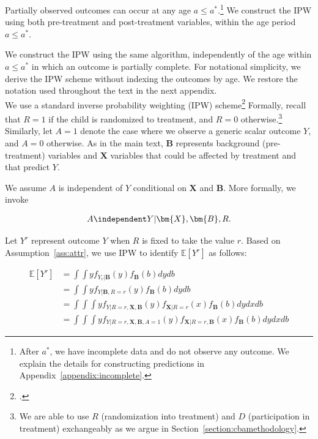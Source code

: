 \noindent Partially observed outcomes can occur at any age $a \leq a^*$.\footnote{After $a^*$, we have incomplete data and do not observe any outcome. We explain the details for constructing predictions in Appendix~\ref{appendix:incomplete}.} We construct the IPW using both pre-treatment and post-treatment variables, within the age period  $a \leq a^*$.

\noindent We construct the IPW using the same algorithm, independently of the age within $a \leq a^*$ in which an outcome is partially complete. For notational simplicity, we derive the IPW scheme without indexing the outcomes by age. We restore the notation used throughout the text in the next appendix. \\

\noindent We use a standard inverse probability weighting (IPW) scheme\footnote{\citet{Horvitz_Thompson_1952_JASA}.} Formally, recall that $R = 1$ if the child is randomized to treatment, and $R = 0$ otherwise.\footnote{We are able to use $R$ (randomization into treatment) and $D$ (participation in treatment) exchangeably as we argue in Section~\ref{section:cbamethodology}.} Similarly, let $A = 1$ denote the case where we observe a generic scalar outcome $Y$, and $A = 0$ otherwise. As in the main text, $\bm{B}$ represents background (pre-treatment) variables and $\bm{X}$ variables that could be affected by treatment and that predict $Y$.

\noindent We assume $A$ is independent of $Y$ conditional on $\bm{X}$ and $\bm{B}$. More formally, we invoke

\begin{assumption} \label{ass:attr}
	\begin{align*}
		A \independent Y | \bm{X}, \bm{B}, R.
	\end{align*}
\end{assumption}

\noindent Let $Y^{r}$ represent outcome $Y$ when $R$ is fixed to take the value $r$. Based on Assumption~\ref{ass:attr}, we use IPW to identify $\mathbb{E}[Y^r]$ as follows:

\begin{align} \label{eq:case2}
\mathbb{E}[Y^r] & = \int \int y f_{ Y_ r| \bm{B} } (y) f_{\bm{B}} (b) dydb \\ \nonumber
	           & = \int \int y f_{Y| \bm{B}, R=r}(y) f_{\bm{B}} (b) dydb \\ \nonumber
	           & = \int \int \int y f_{Y|R=r,\bm{X}, \bm{B}} (y) f_{\bm{X} | R=r} (x) f_{\bm{B}} (b) dydxdb \\ \nonumber
				& = \int \int \int y f_{Y|R=r,\bm{X}, \bm{B}, A=1} (y) f_{\bm{X} | R=r, \bm{B} }(x) f_{\bm{B}} (b) dydxdb
\end{align}

